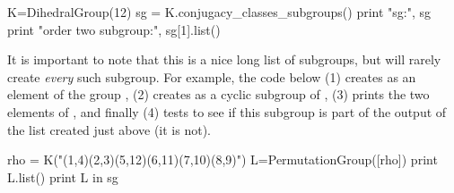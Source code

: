 \documentclass[12pt]{article}
\newcommand{\sageinline}[1]{\lit*{#1}}
\begin{document}
%
\begin{sageverbatim}
K=DihedralGroup(12)
sg = K.conjugacy_classes_subgroups()
print "sg:\n", sg
print "\nAn order two subgroup:\n", sg[1].list()
\end{sageverbatim}
%
It is important to note that this is a nice long list of subgroups, but will rarely create {\em every} such subgroup.  For example, the code below (1) creates \sageinline{rho} as an element of the group \sageinline{K}, (2) creates \sageinline{L} as a cyclic subgroup of \sageinline{K}, (3) prints the two elements of \sageinline{L}, and finally (4) tests to see if this subgroup is part of the output of the list \sageinline{sg} created just above (it is not).
%
\begin{sageverbatim}
rho = K("(1,4)(2,3)(5,12)(6,11)(7,10)(8,9)")
L=PermutationGroup([rho])
print L.list()
print L in sg
\end{sageverbatim}
\end{document}

